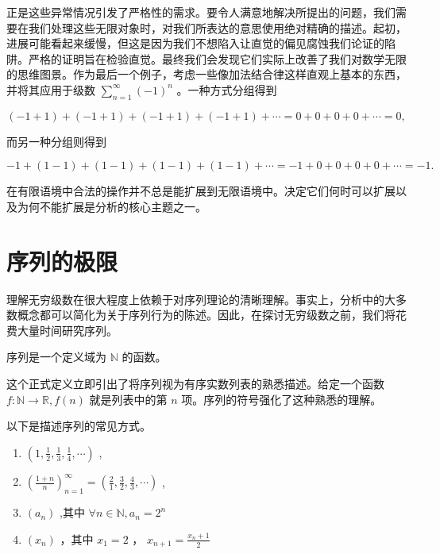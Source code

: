 正是这些异常情况引发了严格性的需求。要令人满意地解决所提出的问题，我们需要在我们处理这些无限对象时，对我们所表达的意思使用绝对精确的描述。起初，进展可能看起来缓慢，但这是因为我们不想陷入让直觉的偏见腐蚀我们论证的陷阱。严格的证明旨在检验直觉。最终我们会发现它们实际上改善了我们对数学无限的思维图景。作为最后一个例子，考虑一些像加法结合律这样直观上基本的东西，并将其应用于级数 \(\mathop{\sum }\limits_{{n = 1}}^{\infty }{\left( -1\right) }^{n}\) 。一种方式分组得到

\[
\left( {-1 + 1}\right)  + \left( {-1 + 1}\right)  + \left( {-1 + 1}\right)  + \left( {-1 + 1}\right)  + \cdots  = 0 + 0 + 0 + 0 + \cdots  = 0,
\]

而另一种分组则得到

\[
- 1 + \left( {1 - 1}\right)  + \left( {1 - 1}\right)  + \left( {1 - 1}\right)  + \left( {1 - 1}\right)  + \cdots  =  - 1 + 0 + 0 + 0 + 0 + \cdots  =  - 1.
\]

在有限语境中合法的操作并不总是能扩展到无限语境中。决定它们何时可以扩展以及为何不能扩展是分析的核心主题之一。

\section{序列的极限}
\label{sec:2.2}
理解无穷级数在很大程度上依赖于对序列理论的清晰理解。事实上，分析中的大多数概念都可以简化为关于序列行为的陈述。因此，在探讨无穷级数之前，我们将花费大量时间研究序列。

\begin{Def}
  \label{def:2.2.1}
  序列是一个定义域为 \(\mathbb{N}\) 的函数。
\end{Def}

这个正式定义立即引出了将序列视为有序实数列表的熟悉描述。给定一个函数 \(f : \mathbb{N} \rightarrow  \mathbb{R},f\left( n\right)\) 就是列表中的第 \(n\) 项。序列的符号强化了这种熟悉的理解。

\begin{Eg}
  \label{eg:2.2.2}
  以下是描述序列的常见方式。
  \begin{enumerate}[label = (\roman*)]
  \item\(\left( {1,\frac{1}{2},\frac{1}{3},\frac{1}{4},\cdots }\right)\) ,
  \item \({\left( \frac{1 + n}{n}\right) }_{n = 1}^{\infty } = \left( {\frac{2}{1},\frac{3}{2},\frac{4}{3},\cdots }\right)\) ,
  \item \(\left( {a}_{n}\right)\) ,其中 \(\forall n\in \mathbb{N}, {a}_{n} = {2}^{n}\) 
  \item  \(\left( {x}_{n}\right)\) ，其中 \({x}_{1} = 2\) ， \({x}_{n + 1} = \frac{{x}_{n} + 1}{2}\) 
  \end{enumerate}
\end{Eg}


